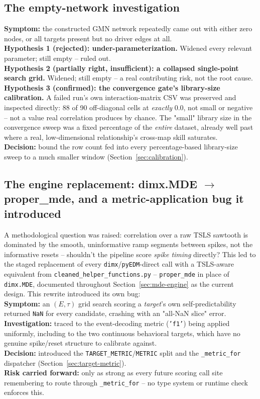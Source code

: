 \documentclass[11pt]{article}
\begin{document}
\subsection{The empty-network investigation}
\label{sec:history-interaction-bug}
\textbf{Symptom:} the constructed GMN network repeatedly came out with either zero nodes, or all targets present but no driver edges at all.\\
\textbf{Hypothesis 1 (rejected): under-parameterization.} Widened every relevant parameter; still empty -- ruled out.\\
\textbf{Hypothesis 2 (partially right, insufficient): a collapsed single-point search grid.} Widened; still empty -- a real contributing risk, not the root cause.\\
\textbf{Hypothesis 3 (confirmed): the convergence gate's library-size calibration.} A failed run's own interaction-matrix CSV was preserved and inspected directly: 88 of 90 off-diagonal cells at \emph{exactly} 0.0, not small or negative -- not a value real correlation produces by chance. The "small" library size in the convergence sweep was a fixed percentage of the \emph{entire} dataset, already well past where a real, low-dimensional relationship's cross-map skill saturates.\\
\textbf{Decision:} bound the row count fed into every percentage-based library-size sweep to a much smaller window (Section~\ref{sec:calibration}).

\subsection{The engine replacement: dimx.MDE $\to$ proper\_mde, and a metric-application bug it introduced}
\label{sec:history-tier}
\label{sec:history-metric-bug}
A methodological question was raised: correlation over a raw TSLS sawtooth is dominated by the smooth, uninformative ramp segments between spikes, not the informative resets -- shouldn't the pipeline score \emph{spike timing} directly? This led to the staged replacement of every \texttt{dimx}/\texttt{pyEDM}-direct call with a TSLS-aware equivalent from \texttt{cleaned\_helper\_functions.py} -- \texttt{proper\_mde} in place of \texttt{dimx.MDE}, documented throughout Section~\ref{sec:mde-engine} as the current design. This rewrite introduced its own bug:\\
\textbf{Symptom:} an $(E,\tau)$ grid search scoring a \emph{target}'s own self-predictability returned \texttt{NaN} for every candidate, crashing with an "all-NaN slice" error.\\
\textbf{Investigation:} traced to the event-decoding metric (\texttt{'f1'}) being applied uniformly, including to the two continuous behavioral targets, which have no genuine spike/reset structure to calibrate against.\\
\textbf{Decision:} introduced the \texttt{TARGET\_METRIC}/\texttt{METRIC} split and the \texttt{\_metric\_for} dispatcher (Section~\ref{sec:target-metric}).\\
\textbf{Risk carried forward:} only as strong as every future scoring call site remembering to route through \texttt{\_metric\_for} -- no type system or runtime check enforces this.
\end{document}
